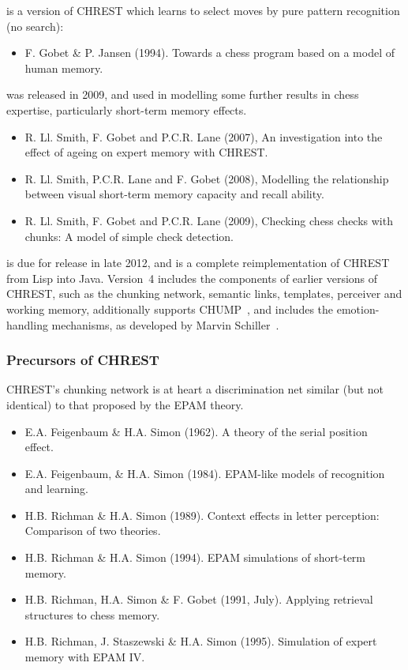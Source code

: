 \documentclass{article}
\begin{document}
 is a version of CHREST which learns to select moves by pure
pattern recognition (no search):

\begin{itemize}
\item F. Gobet \& P. Jansen (1994). Towards a chess program based on a model of
human memory.~\cite{Gobet94} 
\end{itemize}

 was released in 2009, and used in modelling
some further results in chess expertise, particularly short-term memory
effects.

\begin{itemize}
\item R. Ll. Smith, F. Gobet and P.C.R. Lane (2007), An investigation into the
effect of ageing on expert memory with CHREST.~\cite{Smith07}
\item R. Ll. Smith, P.C.R. Lane and F. Gobet (2008), Modelling the relationship
between visual short-term memory capacity and recall ability.~\cite{Smith08}
\item R. Ll. Smith, F. Gobet and P.C.R. Lane (2009), Checking chess checks with
chunks: A model of simple check detection.~\cite{Smith09}
\end{itemize}

 is due for release in late 2012, and is a
complete reimplementation of CHREST from Lisp into Java.  Version~4 includes
the components of earlier versions of CHREST, such as the chunking network,
semantic links, templates, perceiver and working memory, additionally supports
CHUMP~\cite{Bossomaier12,Gobet94}, and includes the emotion-handling
mechanisms, as developed by Marvin Schiller~\cite{Gobet11a}.

\subsubsection{Precursors of CHREST}

CHREST's chunking network is at heart a discrimination net similar (but not
identical) to that proposed by the EPAM theory.

\begin{itemize}
\item E.A. Feigenbaum \& H.A. Simon (1962). A theory of the serial position
effect.~\cite{Feigenbaum62}
\item E.A. Feigenbaum, \& H.A. Simon (1984). EPAM-like models of recognition 
and learning.~\cite{Feigenbaum84}
\item H.B. Richman \& H.A. Simon (1989). Context effects in letter
perception: Comparison of two theories.~\cite{Richman89}
\item H.B. Richman \& H.A. Simon (1994). EPAM simulations of short-term
memory.~\cite{Richman94} 
\item H.B. Richman, H.A. Simon \& F. Gobet (1991, July).
Applying retrieval structures to chess memory.~\cite{Richman91}
\item H.B. Richman, J. Staszewski \& H.A. Simon (1995). Simulation of expert memory with EPAM IV.~\cite{Richman95}
\end{itemize}
\end{document}
